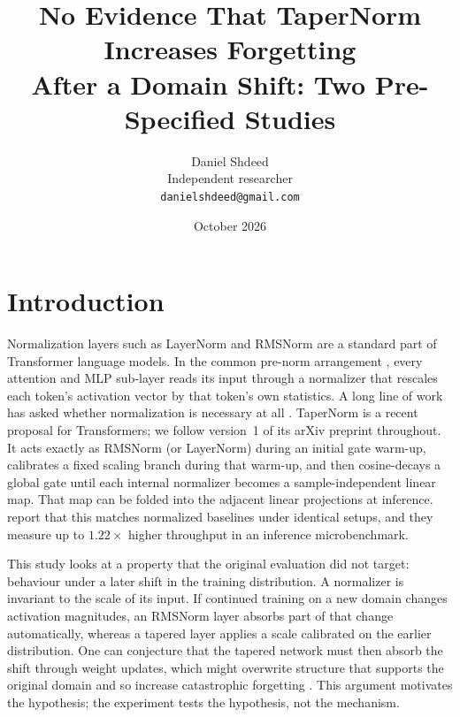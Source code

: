 \documentclass[11pt]{article}
\title{No Evidence That TaperNorm Increases Forgetting\\ After a Domain Shift: Two Pre-Specified Studies}
\author{Daniel Shdeed\\ Independent researcher\\ \texttt{danielshdeed@gmail.com}}
\date{October 2026}
\begin{document}
\maketitle

\begin{abstract}

\end{abstract}

\section{Introduction}

Normalization layers such as LayerNorm \citep{ba2016layer} and RMSNorm \citep{zhang2019rmsnorm} are a standard
part of Transformer language models. In the common pre-norm arrangement \citep{xiong2020layer}, every attention
and MLP sub-layer reads its input through a normalizer that rescales each token's activation vector by that
token's own statistics. A long line of work has asked whether normalization is necessary at all
\citep{zhang2019fixup,brock2021nfnet,he2024simplifying,zhu2025dyt}. TaperNorm \citep{kanavalau2026tapernorm} is a
recent proposal for Transformers; we follow version~1 of its arXiv preprint throughout. It acts exactly as RMSNorm
(or LayerNorm) during an initial gate warm-up, calibrates a fixed scaling branch during that warm-up, and then
cosine-decays a global gate until each internal normalizer becomes a sample-independent linear map. That map can
be folded into the adjacent linear projections at inference. \citet{kanavalau2026tapernorm} report that this
matches normalized baselines under identical setups, and they measure up to $1.22\times$ higher throughput in an
inference microbenchmark.

This study looks at a property that the original evaluation did not target: behaviour under a later shift in the
training distribution. A normalizer is invariant to the scale of its input. If continued training on a new
domain changes activation magnitudes, an RMSNorm layer absorbs part of that change automatically, whereas a
tapered layer applies a scale calibrated on the earlier distribution. One can conjecture that the tapered network
must then absorb the shift through weight updates, which might overwrite structure that supports the original
domain and so increase catastrophic forgetting
\citep{mccloskey1989catastrophic,french1999catastrophic,kirkpatrick2017overcoming}. This argument motivates the
hypothesis; the experiment tests the hypothesis, not the mechanism.
\end{document}
